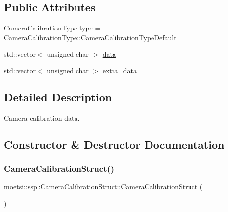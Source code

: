 \subsection*{Public Attributes}
\begin{DoxyCompactItemize}
\item 
\hyperlink{namespacemoetsi_1_1ssp_a1f51291db51233dc5865d42e6ee36ef8}{Camera\+Calibration\+Type} \hyperlink{structmoetsi_1_1ssp_1_1CameraCalibrationStruct_a1ca6c9353a0523a437fe2318d560f39a}{type} = \hyperlink{namespacemoetsi_1_1ssp_a1f51291db51233dc5865d42e6ee36ef8ac32f0bb1b309dd3992d8e37bfaa00c78}{Camera\+Calibration\+Type\+::\+Camera\+Calibration\+Type\+Default}
\item 
std\+::vector$<$ unsigned char $>$ \hyperlink{structmoetsi_1_1ssp_1_1CameraCalibrationStruct_a1e0d53a3a1f78729f4b4eb4d979a8a2d}{data}
\item 
std\+::vector$<$ unsigned char $>$ \hyperlink{structmoetsi_1_1ssp_1_1CameraCalibrationStruct_aba76ffbffe0ba568444a7473f6d081d2}{extra\+\_\+data}
\end{DoxyCompactItemize}


\subsection{Detailed Description}
Camera calibration data. 

\subsection{Constructor \& Destructor Documentation}
\mbox{\label{structmoetsi_1_1ssp_1_1CameraCalibrationStruct_a5571f80a7f6136c795fde444eef1d015}} 
\subsubsection{\texorpdfstring{Camera\+Calibration\+Struct()}{CameraCalibrationStruct()}\hspace{0.1cm}{\footnotesize\ttfamily [1/4]}}
{\footnotesize\ttfamily moetsi\+::ssp\+::\+Camera\+Calibration\+Struct\+::\+Camera\+Calibration\+Struct (\begin{DoxyParamCaption}{ }\end{DoxyParamCaption})\hspace{0.3cm}{\ttfamily [inline]}}

